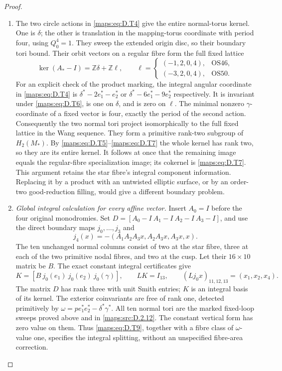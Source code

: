 \begin{proof}
\begin{enumerate}[label=\arabic*.,leftmargin=*]
\item The two circle actions in \eqref{maps:eq:D.T4} give the entire normal-torus
kernel. One is $\delta$; the other is translation in the
mapping-torus coordinate with period four, using $Q_0^4=1$.
They sweep the extended origin disc, so their boundary tori
bound. Their orbit vectors on a regular fibre form the full
fixed lattice
\[
 \ker(A_*-I)=\mathbb Z\delta+\mathbb Z\ell,\qquad
 \ell=\begin{cases}(-1,2,0,4),&\mathrm{OS46},\\
                   (-3,2,0,4),&\mathrm{OS50}.
       \end{cases}
 \tag{D.T8}\label{maps:eq:D.T8}
\]
For an explicit check of the product marking, the integral
angular coordinate in \eqref{maps:eq:D.T4} is
$\delta^*-2e_1^*-e_2^*$ or
$\delta^*-6e_1^*-9e_2^*$ respectively. It is invariant
under \eqref{maps:eq:D.T6}, is one on $\delta$, and is zero on $\ell$.
The minimal nonzero $\gamma$-coordinate of a fixed vector
is four, exactly the period of the second action.
Consequently the two normal tori project isomorphically to
the full fixed lattice in the Wang sequence. They form a
primitive rank-two subgroup of $H_2(M_*)$. By \eqref{maps:eq:D.T5}--\eqref{maps:eq:D.T7}
the whole kernel has rank two, so they are its entire kernel.
It follows at once that the remaining image equals the
regular-fibre specialization image; its cokernel is \eqref{maps:eq:D.T7}.
This argument retains the star fibre's integral component
information. Replacing it by a product with an untwisted
elliptic surface, or by an order-two good-reduction filling,
would give a different boundary problem.

\item \emph{Global integral calculation for every affine vector.}
Insert $A_0=I$ before the four original monodromies. Set
$D=[A_0-I\ A_1-I\ A_2-I\ A_3-I]$, and use the direct
boundary maps $j_0,\ldots,j_3$ and
\[
 j_4(x)=-(A_1A_2A_3x,A_2A_3x,A_3x,x).
\]
The ten unchanged normal columns consist of two at the
star fibre, three at each of the two primitive nodal fibres,
and two at the cusp. Let their $16\times10$ matrix be $B$.
The exact constant integral certificates give
\[
 K=[B\ j_0(e_1)\ j_0(e_2)\ j_0(\gamma)],\qquad
 LK=I_{13},\qquad
 (Lj_0x)_{11,12,13}=(x_1,x_2,x_4).
 \tag{D.T9}\label{maps:eq:D.T9}
\]
The matrix $D$ has rank three with unit Smith entries;
$K$ is an integral basis of its kernel. The exterior
coinvariants are free of rank one, detected primitively by
$\omega=p e_1^*e_2^*-\delta^*\gamma^*$.
All ten normal tori are the marked fixed-loop sweeps proved
above and in \ref{maps:src:D.2.12}. The constant vertical form has zero
value on them. Thus \eqref{maps:eq:D.T9}, together with a fibre class of
$\omega$-value one, specifies the integral splitting,
without an unspecified fibre-area correction.


\end{enumerate}
\end{proof}
